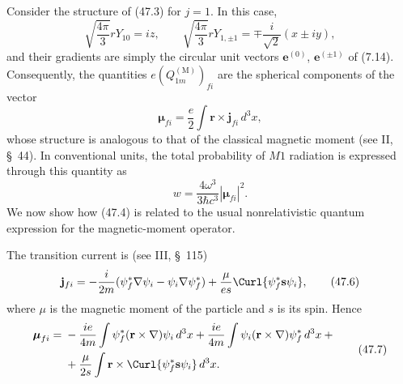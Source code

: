 Consider the structure of (47.3) for $j=1$. In this case,
\[
\sqrt{\frac{4\pi}{3}}rY_{10}=iz,
\qquad
\sqrt{\frac{4\pi}{3}}rY_{1,\pm1}=\mp\frac{i}{\sqrt2}(x\pm iy),
\]
and their gradients are simply the circular unit vectors $\mathbf e^{(0)}$, $\mathbf e^{(\pm1)}$ of (7.14). Consequently, the quantities $e(Q_{1m}^{(\mathrm M)})_{fi}$ are the spherical components of the vector
\begin{equation}
\boldsymbol\mu_{fi}=\frac e2\int\mathbf r\times\mathbf j_{fi}\,d^3x,
\tag{47.4}
\end{equation}
whose structure is analogous to that of the classical magnetic moment (see II, \S~44). In conventional units, the total probability of $M1$ radiation is expressed through this quantity as
\begin{equation}
w=\frac{4\omega^3}{3\hbar c^3}|\boldsymbol\mu_{fi}|^2.
\tag{47.5}
\end{equation}
We now show how (47.4) is related to the usual nonrelativistic quantum expression for the magnetic-moment operator.

The transition current is (see III, \S~115)
\begin{equation}
\mathbf j_{fi}=-\frac{i}{2m}(\psi_f^*\nabla\psi_i-\psi_i\nabla\psi_f^*)
+\frac\mu{es}\Curl{\psi_f^*\mathbf s\psi_i},
\tag{47.6}
\end{equation}
where $\mu$ is the magnetic moment of the particle and $s$ is its spin. Hence
\begin{equation}
\begin{aligned}
\boldsymbol\mu_{fi}={}&-\frac{ie}{4m}\int\psi_f^*(\mathbf r\times\nabla)\psi_i\,d^3x
+\frac{ie}{4m}\int\psi_i(\mathbf r\times\nabla)\psi_f^*\,d^3x+{}\\
&+\frac\mu{2s}\int\mathbf r\times\Curl{\psi_f^*\mathbf s\psi_i}\,d^3x.
\end{aligned}
\tag{47.7}
\end{equation}

